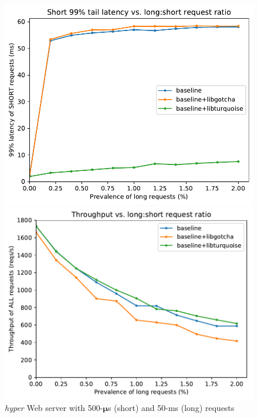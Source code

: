 \begin{figure}
	\begin{minipage}{0.5\textwidth}
	\includegraphics[width=\textwidth]{figs/twooom_99-short}
	\end{minipage}
%
	\begin{minipage}{0.5\textwidth}
	\includegraphics[width=\textwidth]{figs/twooom_tput}
	\end{minipage}
\caption{\textit{hyper} Web server with 500-$\boldsymbol\mu$s (short) and 50-ms (long) requests}
\label{fig:hyper}
\end{figure}


